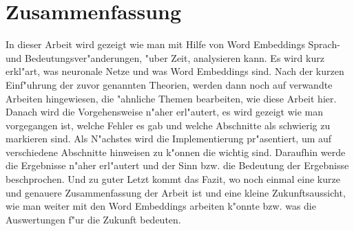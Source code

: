 \chapter*{Zusammenfassung}
In dieser Arbeit wird gezeigt wie man mit Hilfe von Word Embeddings Sprach- und Bedeutungsver"anderungen, "uber Zeit, analysieren kann. Es wird kurz erkl"art, was neuronale Netze und was Word Embeddings sind. Nach der kurzen Einf"uhrung der zuvor genannten Theorien, werden dann noch auf verwandte Arbeiten hingewiesen, die "ahnliche Themen bearbeiten, wie diese Arbeit hier. Danach wird die Vorgehensweise n"aher erl"autert, es wird gezeigt wie man vorgegangen ist, welche Fehler es gab und welche Abschnitte als schwierig zu markieren sind. 
Als N"achstes wird die Implementierung pr"asentiert, um auf verschiedene Abschnitte hinweisen zu k"onnen die wichtig sind. Daraufhin werde die Ergebnisse n"aher erl"autert und der Sinn bzw. die Bedeutung der Ergebnisse beschprochen. Und zu guter Letzt kommt das Fazit, wo noch einmal eine kurze und genauere Zusammenfassung der Arbeit ist und eine kleine Zukunftsaussicht, wie man weiter mit den Word Embeddings arbeiten k"onnte bzw. was die Auswertungen f"ur die Zukunft bedeuten.
